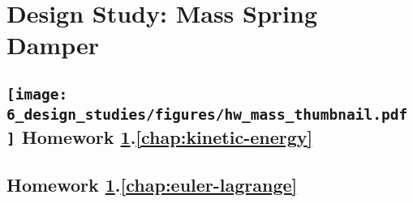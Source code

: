 
\chapter{Design Study: Mass Spring Damper}
\label{hw:mass}




\vspace{.5cm}



\clearpage

	\section*{
			{\texttt{[image: 6\_design\_studies/figures/hw\_mass\_thumbnail.pdf]}}
		Homework \ref{hw:mass}.\ref{chap:kinetic-energy}} \label{hw:mass_kinetic}
		

%		
	\section*{
		Homework \ref{hw:mass}.\ref{chap:euler-lagrange}}  		
		\label{hw:mass_equations_of_motion}
		

